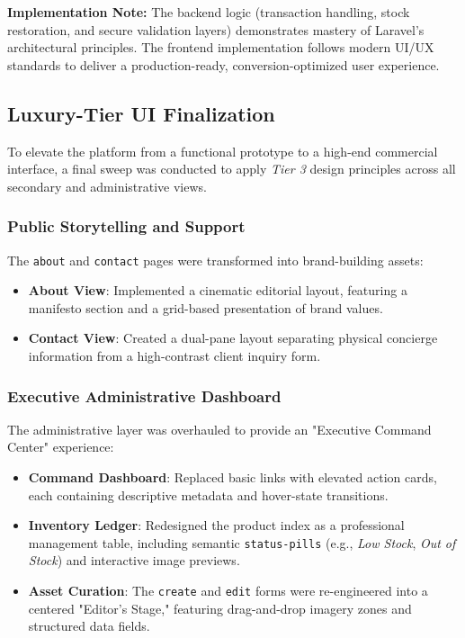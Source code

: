 \documentclass[12pt,a4paper]{article}
\begin{document}

\noindent \textbf{Implementation Note:}  
The backend logic (transaction handling, stock restoration, and secure validation layers) demonstrates mastery of Laravel’s architectural principles. The frontend implementation follows modern UI/UX standards to deliver a production-ready, conversion-optimized user experience.


\subsection{Luxury-Tier UI Finalization}

To elevate the platform from a functional prototype to a high-end commercial interface, a final sweep was conducted to apply \textit{Tier 3} design principles across all secondary and administrative views.

\subsubsection{Public Storytelling and Support}

The \texttt{about} and \texttt{contact} pages were transformed into brand-building assets:

\begin{itemize}
    \item \textbf{About View}: Implemented a cinematic editorial layout, featuring a manifesto section and a grid-based presentation of brand values.
    \item \textbf{Contact View}: Created a dual-pane layout separating physical concierge information from a high-contrast client inquiry form.
\end{itemize}

\subsubsection{Executive Administrative Dashboard}

The administrative layer was overhauled to provide an "Executive Command Center" experience:

\begin{itemize}
    \item \textbf{Command Dashboard}: Replaced basic links with elevated action cards, each containing descriptive metadata and hover-state transitions.
    \item \textbf{Inventory Ledger}: Redesigned the product index as a professional management table, including semantic \texttt{status-pills} (e.g., \textit{Low Stock}, \textit{Out of Stock}) and interactive image previews.
    \item \textbf{Asset Curation}: The \texttt{create} and \texttt{edit} forms were re-engineered into a centered "Editor's Stage," featuring drag-and-drop imagery zones and structured data fields.
\end{itemize}
\end{document}
